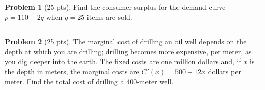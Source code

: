 \documentclass[12pt]{article}
\theoremstyle{definition}
\newtheorem{problem}{Problem}
\begin{document}
\bigskip
\begin{problem}[25 pts]
Find the consumer surplus for the demand curve $p=110-2q$ when $q=25$ items are sold.
\vspace{10cm}
\end{problem}
\hrule

\begin{problem}[25 pts]
The marginal cost of drilling an oil well depends on the depth at which you are drilling; drilling becomes more expensive, per meter, as you dig deeper into the earth.  The fixed costs are one million dollars and, if $x$ is the depth in meters, the marginal costs are $C'(x) = 500 + 12x$ dollars per meter.  Find the total cost of drilling a 400-meter well.
\end{problem}
\end{document}

